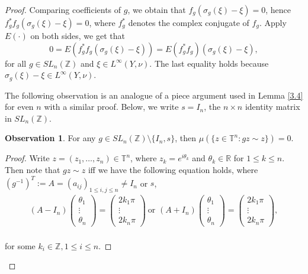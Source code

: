 \documentclass[12pt]{amsart}
\theoremstyle{definition}
\newtheorem{observation}[theorem]{Observation}
\theoremstyle{remark}
\begin{document}
\begin{proof}
Comparing coefficients of $g$, we obtain that $f_g(\sigma_g(\xi)-\xi)=0$, hence $f_g^*f_g(\sigma_g(\xi)-\xi)=0$, where $f_g^*$ denotes the complex conjugate of $f_g$. Apply $E(\cdot)$ on both sides, we get that 
\begin{equation}\label{lemma7 equation 1}
0=E(f_g^*f_g(\sigma_g(\xi)-\xi)) = E(f_g^*f_g)(\sigma_g(\xi)-\xi),
\end{equation} for all $g\in SL_{n}(\mathbb{Z}) $ and $\xi \in L^{\infty}(Y,\nu)$.
The last equality holds because $\sigma_g(\xi)-\xi \in L^{\infty}(Y, \nu)$.

The following observation is an analogue of a piece argument used in Lemma \ref{3.4} for even $n$ with a similar proof. Below, we write $s=I_n$, the $n\times n$ identity matrix in $SL_n(\mathbb{Z})$.

\begin{observation}\label{observation2}
    For any $g\in SL_{n}(\mathbb{Z})\setminus \{I_n,s\}$, then $ \mu(\{z\in \mathbb{T}^{n}:gz\sim z\})=0$.
\end{observation}
\begin{proof} Write $z=(z_1,\dots,z_n)\in \mathbb{T}^n$, where $z_{k} = e^{i\theta_{k}}$ and $\theta_k \in \mathbb{R}$ for $1\le k \le n$. Then 
note that $gz\sim z$ iff we have the following equation holds, where $(g^{-1})^{T}:=A=(a_{ij})_{1\le i,j\le n}\ne I_{n}$ or $s$, 
 \begin{align*}
        (A-I_{n})\begin{pmatrix}
            \theta_{1}\\
            \vdots\\
            \theta_{n}
        \end{pmatrix}=\begin{pmatrix}
            2k_{1}\pi\\
            \vdots\\
            2k_{n}\pi
        \end{pmatrix}~\text{or~}
        (A+I_{n})\begin{pmatrix}
            \theta_{1}\\
            \vdots\\
            \theta_{n}
        \end{pmatrix}=\begin{pmatrix}
            2k_{1}\pi\\
            \vdots\\
            2k_{n}\pi
            \end{pmatrix},
    \end{align*}\\
for some $k_i\in \mathbb{Z}, 1\le i \le n$.    


\end{proof}
\end{proof}
\end{document}
